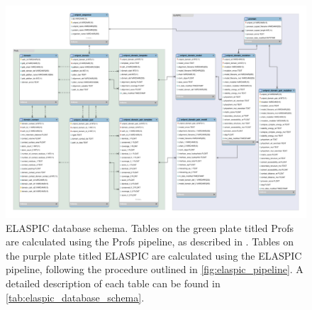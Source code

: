 \begin{figure}[!tb]
	\centering
	\includegraphics[width=1.0\textwidth]{static/elaspic/elaspic_schema.pdf}
	\caption[ELASPIC database schema.]{ELASPIC database schema. Tables on the green plate titled Profs are calculated using the Profs pipeline, as described in \cite{witvliet_elaspic_2016}. Tables on the purple plate titled ELASPIC are calculated using the ELASPIC pipeline, following the procedure outlined in \ref{fig:elaspic_pipeline}. A detailed description of each table can be found in \ref{tab:elaspic_database_schema}.}
    \label{fig:elaspic_database_schema}
\end{figure}


